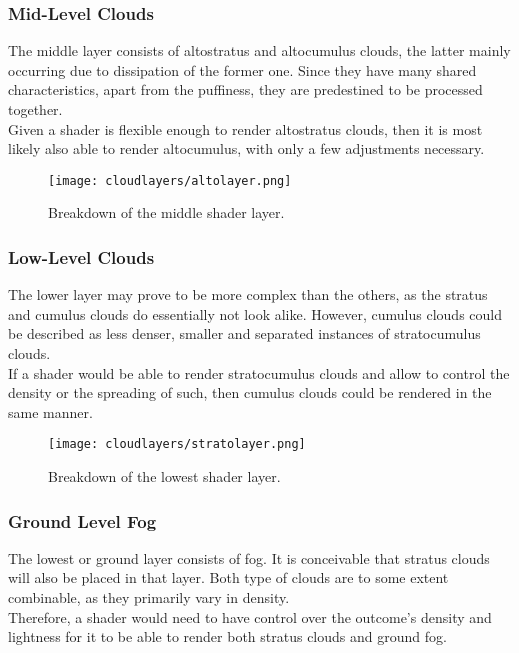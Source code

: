\subsubsection{Mid-Level Clouds}
\label{section:impl:layers:mid}
The middle layer consists of altostratus and altocumulus clouds, the latter mainly occurring due to dissipation of the former one.
Since they have many shared characteristics, apart from the puffiness, they are predestined to be processed together.
\\
Given a \gls{shader} is flexible enough to render altostratus clouds, then it is most likely also able to render altocumulus, with only a few adjustments necessary.

\begin{figure}[H]
    \texttt{[image: cloudlayers/altolayer.png]}
    \caption{Breakdown of the middle shader layer.}
    \label{img:cloudlayer:alto}
\end{figure}

\pagebreak

\subsubsection{Low-Level Clouds}
\label{section:impl:layers:low}
The lower layer may prove to be more complex than the others, as the stratus and cumulus clouds do essentially not look alike.
However, cumulus clouds could be described as less denser, smaller and separated instances of stratocumulus clouds.
\\
If a \gls{shader} would be able to render stratocumulus clouds and allow to control the density or the spreading of such, then cumulus clouds could be rendered in the same manner.

\begin{figure}[H]
    \texttt{[image: cloudlayers/stratolayer.png]}
    \caption{Breakdown of the lowest shader layer.}
    \label{img:cloudlayer:strato}
\end{figure}


\subsubsection{Ground Level Fog}
\label{section:impl:layers:fog}
The lowest or ground layer consists of fog. It is conceivable that stratus clouds will also be placed in that layer.
Both type of clouds are to some extent combinable, as they primarily vary in density.
\\
Therefore, a \gls{shader} would need to have control over the outcome's density and lightness for it to be able to render both stratus clouds and ground fog.


